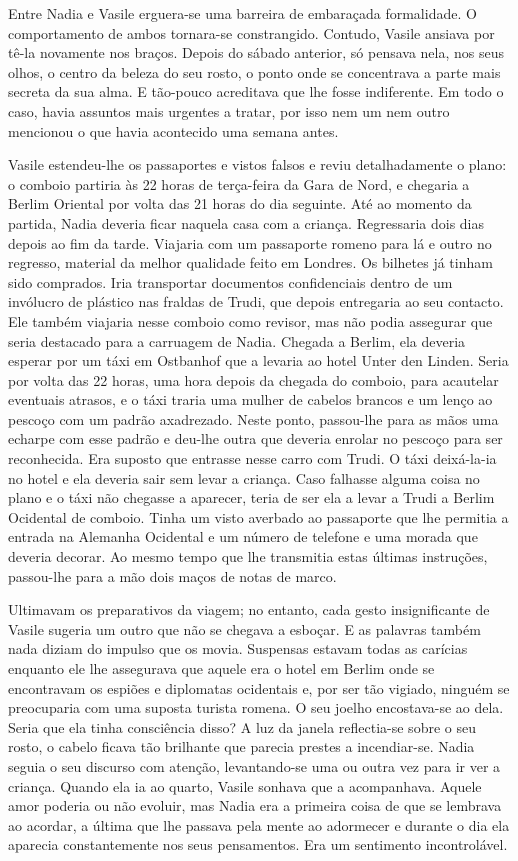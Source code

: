Entre Nadia e Vasile erguera-se uma barreira de embaraçada
formalidade. O comportamento de ambos tornara-se constrangido. Contudo, Vasile ansiava por tê-la novamente nos
braços. Depois do sábado anterior, só pensava nela, nos seus olhos, o
centro da beleza do seu rosto, o ponto onde se concentrava a parte mais
secreta da sua alma. E tão-pouco acreditava que lhe fosse indiferente.
Em todo o caso, havia assuntos mais urgentes a tratar, por isso
nem um nem outro mencionou o que havia acontecido uma semana antes.

Vasile estendeu-lhe os passaportes e vistos falsos e reviu
detalhadamente o plano: o comboio partiria às 22 horas de terça-feira da
Gara de Nord, e chegaria a Berlim Oriental por volta das 21 horas do
dia seguinte. Até ao momento da partida, Nadia deveria ficar naquela
casa com a criança. Regressaria dois dias depois ao fim da tarde.
Viajaria com um passaporte romeno para lá e outro no regresso, material da melhor qualidade feito em Londres. Os bilhetes já tinham sido
comprados. Iria transportar documentos confidenciais dentro de um
invólucro de plástico nas fraldas de Trudi, que depois entregaria ao
seu contacto. Ele também viajaria nesse comboio como revisor, mas não
podia assegurar que seria destacado para a carruagem de Nadia. Chegada a
Berlim, ela deveria esperar por um táxi em Ostbanhof que a levaria ao
hotel Unter den Linden. Seria por volta das 22 horas, uma hora depois da
chegada do comboio, para acautelar eventuais atrasos, e o táxi traria
uma mulher de cabelos brancos e um lenço ao pescoço com um padrão
axadrezado. Neste ponto, passou-lhe para as mãos uma echarpe com esse
padrão e deu-lhe outra que deveria enrolar no pescoço para ser
reconhecida. Era suposto que entrasse nesse carro com Trudi. O táxi
deixá-la-ia no hotel e ela deveria sair sem levar a criança. Caso
falhasse alguma coisa no plano e o táxi não chegasse a aparecer, teria
de ser ela a levar a Trudi a Berlim Ocidental de comboio. Tinha um
visto averbado ao passaporte que lhe permitia a entrada na Alemanha
Ocidental e um número de telefone e uma morada que deveria decorar. Ao
mesmo tempo que lhe transmitia estas últimas instruções, passou-lhe para
a mão dois maços de notas de marco.

Ultimavam os preparativos da viagem; no entanto, cada gesto
insignificante de Vasile sugeria um outro que não se chegava a esboçar.
E as palavras também nada diziam do impulso que os movia. Suspensas
estavam todas as carícias enquanto ele lhe assegurava que aquele era o
hotel em Berlim onde se encontravam os espiões e diplomatas ocidentais
e, por ser tão vigiado, ninguém se preocuparia com uma suposta turista
romena. O seu joelho encostava-se ao dela. Seria que ela tinha
consciência disso? A luz da janela reflectia-se sobre o seu rosto, o
cabelo ficava tão brilhante que parecia prestes a incendiar-se. Nadia
seguia o seu discurso com atenção, levantando-se uma ou outra vez para
ir ver a criança. Quando ela ia ao quarto, Vasile sonhava que a
acompanhava. Aquele amor poderia ou não evoluir, mas Nadia era a
primeira coisa de que se lembrava ao acordar, a última que lhe passava
pela mente ao adormecer e durante o dia ela aparecia constantemente
nos seus pensamentos. Era um sentimento incontrolável.


